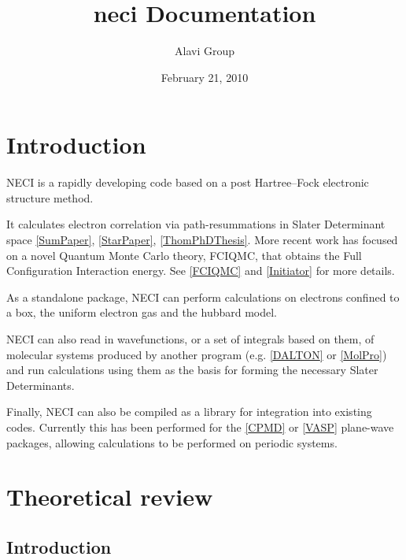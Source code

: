 \documentclass[openany,a4paper,10pt,english]{manual}
\title{neci Documentation}
\date{February 21, 2010}
\author{Alavi Group}
\begin{document}
\maketitle
\tableofcontents
\hypertarget{--doc-index}{}


\resetcurrentobjects
\hypertarget{--doc-introduction}{}

\hypertarget{introduction}{}\chapter{Introduction}

NECI is a rapidly developing code based on a post Hartree--Fock electronic structure method.

It calculates electron correlation via path-resummations in Slater Determinant
space \hyperlink{sumpaper}{{[}SumPaper{]}}, \hyperlink{starpaper}{{[}StarPaper{]}}, \hyperlink{thomphdthesis}{{[}ThomPhDThesis{]}}.  More recent work has
focused on a novel Quantum Monte Carlo theory, FCIQMC, that obtains the Full
Configuration Interaction energy.  See \hyperlink{fciqmc}{{[}FCIQMC{]}} and \hyperlink{initiator}{{[}Initiator{]}} for more details.

As a standalone package, NECI can perform calculations on electrons confined to
a box, the uniform electron gas and the hubbard model.

NECI can also read in wavefunctions, or a set of integrals based on them, of
molecular systems produced by another program (e.g. \hyperlink{dalton}{{[}DALTON{]}} or \hyperlink{molpro}{{[}MolPro{]}}) and
run calculations using them as the basis for forming the necessary Slater
Determinants.

Finally, NECI can also be compiled as a library for integration into existing
codes.  Currently this has been performed for the \hyperlink{cpmd}{{[}CPMD{]}} or \hyperlink{vasp}{{[}VASP{]}} plane-wave
packages, allowing calculations to be performed on periodic systems.

\resetcurrentobjects
\hypertarget{--doc-theory/index}{}

\hypertarget{theory-index}{}\chapter{Theoretical review}

\resetcurrentobjects
\hypertarget{--doc-theory/introduction}{}

\hypertarget{theory-introduction}{}\section{Introduction}
\end{document}
